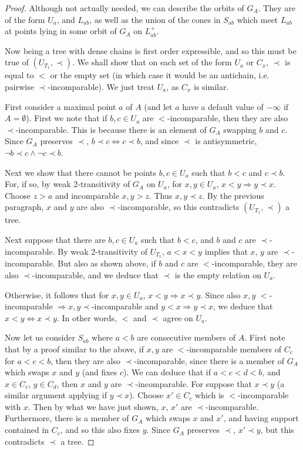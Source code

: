 \documentclass[10pt,a4paper]{amsart}
\begin{document}
\begin{proof}
Although not actually needed, we can describe the orbits of $G_A$. They are of the form $U_a$, and $L_{ab}$, as well 
as the union of the cones in $S_{ab}$ which meet $L_{ab}$ at points lying in some orbit of $G_A$ on $L_{ab}^+$.

Now being a tree with dense chains is first order expressible, and so this must be true of $(U_{T_1}, \prec)$. We shall show
that on each set of the form $U_a$ or $C_x$, $\prec$ is equal to $<$ or the empty set (in which case it would be an antichain, 
i.e. pairwise $\prec$-incomparable). We just treat $U_a$, as $C_x$ is similar.

First consider a maximal point $a$ of $A$ (and let $a$ have a default value of $-\infty$ if $A = \emptyset$). First we note
that if $b, c \in U_a$ are $<$-incomparable, then they are also $\prec$-incomparable. This is because there is an 
element of $G_A$ swapping $b$ and $c$. Since $G_A$ preserves $\prec$, $b \prec c \Leftrightarrow c \prec b$, and since
$\prec$ is antisymmetric, $\neg b \prec c \wedge \neg c \prec b$. 

Next we show that there cannot be points $b, c \in U_a$ such that $b < c$ and $c \prec b$. For, if so, by weak
2-transitivity of $G_A$ on $U_a$, for $x, y \in U_a$, $x < y \Rightarrow y \prec x$. Choose $z > a$ and incomparable 
$x, y > z$. Thus $x, y \prec z$. By the previous paragraph, $x$ and $y$ are also $\prec$-incomparable, so this 
contradicts $(U_{T_1}, \prec)$ a tree. 

Next suppose that there are $b, c \in U_a$ such that $b < c$, and $b$ and $c$ are $\prec$-incomparable. By 
weak 2-transitivity of $U_{T_1}$, $a < x < y$ implies that $x$, $y$ are $\prec$-incomparable. But also as shown above, if
$b$ and $c$ are $<$-incomparable, they are also $\prec$-incomparable, and we deduce that $\prec$ is the empty relation
on $U_a$.

Otherwise, it follows that for $x, y \in U_a$, $x < y \Rightarrow x \prec y$. Since also $x, y$ $<$-incomparable
$\Rightarrow x, y \prec$-incomparable and $y < x \Rightarrow y \prec x$, we deduce that $x < y \Leftrightarrow x \prec y$. 
In other words, $<$ and $\prec$ agree on $U_a$.

Now let us consider $S_{ab}$ where $a < b$ are consecutive members of $A$. First note that by a proof similar to the above,
if $x, y$ are $<$-incomparable members of $C_c$ for $a < c < b$, then they are also $\prec$-incomparable, since there is a 
member of $G_A$ which swaps $x$ and $y$ (and fixes $c$). We can deduce that if $a < c < d < b$, and $x \in C_c$, $y \in C_d$,
then $x$ and $y$ are $\prec$-incomparable. For suppose that $x \prec y$ (a similar argument applying if $y \prec x$). Choose
$x' \in C_c$ which is $<$-incomparable with $x$. Then by what we have just shown, $x$, $x'$ are $\prec$-incomparable. 
Furthermore, there is a member of $G_A$ which swaps $x$ and $x'$, and having support contained in $C_c$, and so this also
fixes $y$. Since $G_A$ preserves $\prec$, $x' \prec y$, but this contradicts $\prec$ a tree.


\end{proof}
\end{document}
